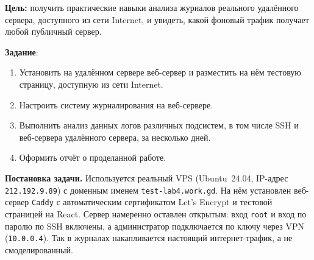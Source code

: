 \textbf{Цель:} получить практические навыки анализа журналов реального
удалённого сервера, доступного из сети Internet, и увидеть, какой фоновый
трафик получает любой публичный сервер.

\vspace{1em}

\textbf{Задание}:
\begin{enumerate}
  \item Установить на удалённом сервере веб-сервер и разместить на нём
  тестовую страницу, доступную из сети Internet.
  \item Настроить систему журналирования на веб-сервере.
  \item Выполнить анализ данных логов различных подсистем, в том числе
  SSH и веб-сервера удалённого сервера, за несколько дней.
  \item Оформить отчёт о проделанной работе.
\end{enumerate}

\textbf{Постановка задачи.} Используется реальный VPS (Ubuntu~24.04,
IP-адрес \texttt{212.192.9.89}) с доменным именем
\texttt{test-lab4.work.gd}. На нём установлен веб-сервер \texttt{Caddy} с
автоматическим сертификатом Let's Encrypt и тестовой страницей на React.
Сервер намеренно оставлен открытым: вход \texttt{root} и вход по паролю по
SSH включены, а администратор подключается по ключу через VPN
(\texttt{10.0.0.4}). Так в журналах накапливается настоящий интернет-трафик,
а не смоделированный.
